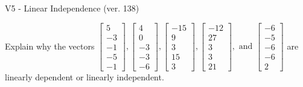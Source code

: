 \begin{exercise}
  \begin{exerciseTitle}V5 - Linear Independence (ver. 138)\end{exerciseTitle}
  \begin{exerciseStatement}
    Explain why the vectors \(\left[\begin{array}{r}
5 \\
-3 \\
-1 \\
-5 \\
-1
\end{array}\right] , \left[\begin{array}{r}
4 \\
0 \\
-3 \\
-3 \\
-6
\end{array}\right] , \left[\begin{array}{r}
-15 \\
9 \\
3 \\
15 \\
3
\end{array}\right] , \left[\begin{array}{r}
-12 \\
27 \\
3 \\
3 \\
21
\end{array}\right] , \text{ and } \left[\begin{array}{r}
-6 \\
-5 \\
-6 \\
-6 \\
2
\end{array}\right]\) are linearly dependent or linearly independent.	



\end{exerciseStatement}
\end{exercise}
